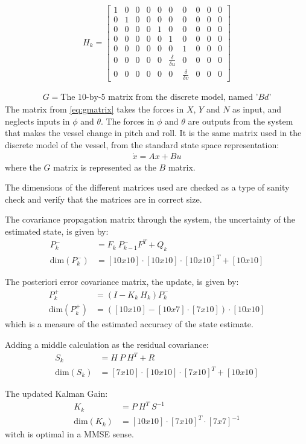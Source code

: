 \begin{align}
H_k =
\begin{bmatrix}
1 & 0 & 0 & 0 & 0 & 0 & 0 & 0 & 0 & 0 \\
0 & 1 & 0 & 0 & 0 & 0 & 0 & 0 & 0 & 0 \\
0 & 0 & 0 & 0 & 1 & 0 & 0 & 0 & 0 & 0 \\
0 & 0 & 0 & 0 & 0 & 1 & 0 & 0 & 0 & 0 \\
0 & 0 & 0 & 0 & 0 & 0 & 1 & 0 & 0 & 0 \\
0 & 0 & 0 & 0 & 0 & \frac{\delta}{\delta u} & 0 & 0 & 0 & 0 \\
0 & 0 & 0 & 0 & 0 & 0 & \frac{\delta}{\delta v} & 0 & 0 & 0
\end{bmatrix}
\end{align}

\begin{align}
G = \text{The 10-by-5 matrix from the discrete model, named '$Bd$'}
\label{eq:gmatrix}
\end{align}
The matrix from \ref{eq:gmatrix} takes the forces in $X$, $Y$ and $N$ as input, and neglects inputs in $\phi$ and $\theta$. The forces in $\phi$ and $\theta$ are outputs from the system that makes the vessel change in pitch and roll. It is the same matrix used in the discrete model of the vessel, from the standard state space representation:
\begin{align}
\dot x = Ax + Bu
\end{align}
where the $G$ matrix is represented as the $B$ matrix.

The dimensions of the different matrices used are checked as a type of sanity check and verify that the matrices are in correct size.

The covariance propagation matrix through the system, the uncertainty of the estimated state, is given by:
\begin{align}
P_k^- &= F_k\ P_{k-1}^-F^T + Q_k\\
\text{dim}(P_k^-) &= [10x10]\cdot [10x10]\cdot [10x10]^T + [10x10]
\end{align}


The posteriori error covariance matrix, the update, is given by:
\begin{align}
P_k^+ &= (I - K_k\ H_k)P_k^-\\
\text{dim}(P_k^+) &= ([10x10] - [10x7]\cdot [7x10])\cdot [10x10]
\end{align}
which is a measure of the estimated accuracy of the state estimate.

Adding a middle calculation as the residual covariance:
\begin{align}
S_k &= H\ P\ H^T + R\\
\text{dim}(S_k) &= [7x10]\cdot [10x10]\cdot [7x10]^T + [10x10]
\end{align}

The updated Kalman Gain:
\begin{align}
K_k &= P\ H^T\ S^{-1}\\
\text{dim}(K_k) &= [10x10]\cdot [7x10]^T\cdot [7x7]^{-1}
\end{align}
witch is optimal in a MMSE sense.